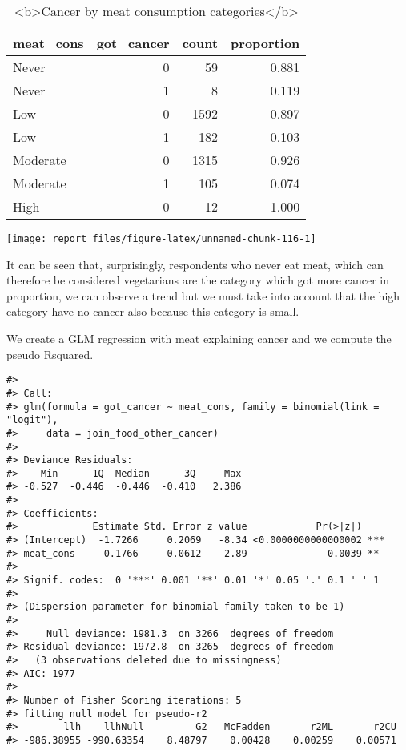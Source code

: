 \documentclass[
]{article}
\begin{document}
\begin{table}

\caption{\label{tab:unnamed-chunk-115}<b>Cancer by meat consumption categories</b>}
\centering
\begin{tabular}[t]{l|r|r|r}
\hline
meat\_cons & got\_cancer & count & proportion\\
\hline
Never & 0 & 59 & 0.881\\
\hline
Never & 1 & 8 & 0.119\\
\hline
Low & 0 & 1592 & 0.897\\
\hline
Low & 1 & 182 & 0.103\\
\hline
Moderate & 0 & 1315 & 0.926\\
\hline
Moderate & 1 & 105 & 0.074\\
\hline
High & 0 & 12 & 1.000\\
\hline
\end{tabular}
\end{table}

\begin{center}\texttt{[image: report\_files/figure-latex/unnamed-chunk-116-1]} \end{center}

It can be seen that, surprisingly, respondents who never eat meat, which
can therefore be considered vegetarians are the category which got more
cancer in proportion, we can observe a trend but we must take into
account that the high category have no cancer also because this category
is small.

We create a GLM regression with meat explaining cancer and we compute
the pseudo Rsquared.

\begin{verbatim}
#> 
#> Call:
#> glm(formula = got_cancer ~ meat_cons, family = binomial(link = "logit"), 
#>     data = join_food_other_cancer)
#> 
#> Deviance Residuals: 
#>    Min      1Q  Median      3Q     Max  
#> -0.527  -0.446  -0.446  -0.410   2.386  
#> 
#> Coefficients:
#>             Estimate Std. Error z value            Pr(>|z|)    
#> (Intercept)  -1.7266     0.2069   -8.34 <0.0000000000000002 ***
#> meat_cons    -0.1766     0.0612   -2.89              0.0039 ** 
#> ---
#> Signif. codes:  0 '***' 0.001 '**' 0.01 '*' 0.05 '.' 0.1 ' ' 1
#> 
#> (Dispersion parameter for binomial family taken to be 1)
#> 
#>     Null deviance: 1981.3  on 3266  degrees of freedom
#> Residual deviance: 1972.8  on 3265  degrees of freedom
#>   (3 observations deleted due to missingness)
#> AIC: 1977
#> 
#> Number of Fisher Scoring iterations: 5
#> fitting null model for pseudo-r2
#>        llh    llhNull         G2   McFadden       r2ML       r2CU 
#> -986.38955 -990.63354    8.48797    0.00428    0.00259    0.00571
\end{verbatim}
\end{document}
